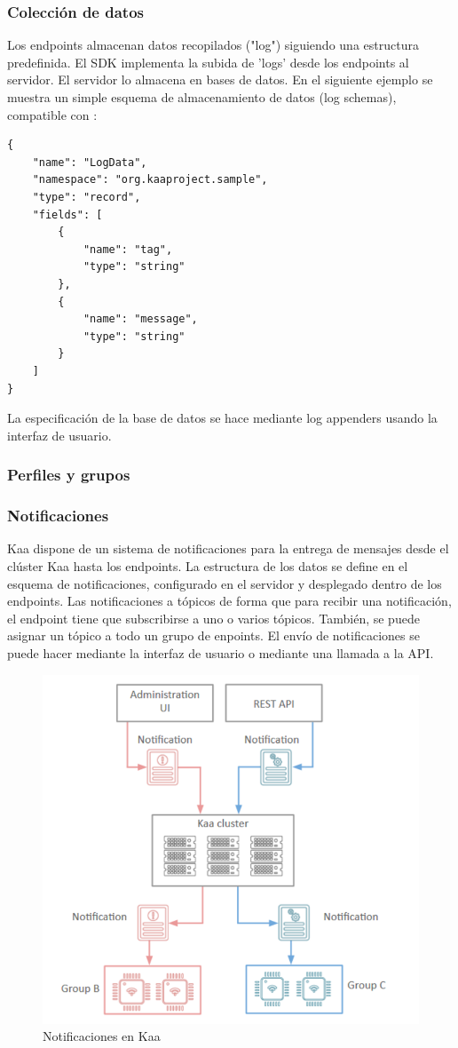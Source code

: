 \documentclass[12pt, twoside]{book}
\newcommand{\MYhref}[3][blue]{\href{#2}{\color{#1}{#3}}}
\begin{document}
\subsubsection*{Colección de datos}
Los endpoints almacenan datos recopilados ("log") siguiendo una estructura predefinida. El SDK implementa la subida de 'logs' desde los endpoints al servidor. El servidor lo almacena en bases de datos. En el siguiente ejemplo se muestra un simple esquema de almacenamiento de datos (log schemas), compatible con \MYhref{http://avro.apache.org/docs/current/spec.html}{Avro Schema}:
\begin{lstlisting}
{
    "name": "LogData",
    "namespace": "org.kaaproject.sample",
    "type": "record",
    "fields": [
    	{
            "name": "tag",
            "type": "string"
        },
        {
            "name": "message",
            "type": "string"
        }
    ]
}
\end{lstlisting}
La especificación de la base de datos se hace mediante log appenders usando la interfaz de usuario. 
\subsubsection*{Perfiles y grupos}

\subsubsection*{Notificaciones}
Kaa dispone de un sistema de notificaciones para la entrega de mensajes desde el clúster Kaa hasta los endpoints. La estructura de los datos se define en el esquema de notificaciones, configurado en el servidor y desplegado dentro de los endpoints. Las notificaciones a tópicos de forma que para recibir una notificación, el endpoint tiene que subscribirse a uno o varios tópicos. También, se puede asignar un tópico a todo un grupo de enpoints. El envío de notificaciones se puede hacer mediante la interfaz de usuario o mediante una llamada a la API. 
\begin{figure}[H]
\centering
\includegraphics[scale=0.5]{images/notifications}
\caption{Notificaciones en Kaa}\label{L508}
\end{figure}
\end{document}
